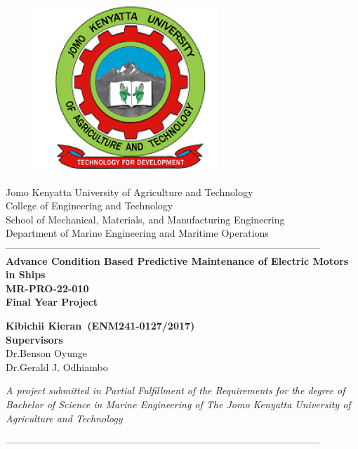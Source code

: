 \documentclass[12pt,fleqn]{article}
\begin{document}
\begin{titlepage}
  \begin{center}
      \vspace*{-4.0cm}
    \begin{figure}[!h]
\centering
\includegraphics[width=0.3\linewidth]{Figures/JKUAT_logo}
\label{fig:jomologo}
\end{figure}
   \large{Jomo Kenyatta University of Agriculture and Technology}\\
    \large{College of Engineering and Technology}\\
    \large{School of Mechanical, Materials, and Manufacturing Engineering}\\
   \large{Department of Marine Engineering and Maritime Operations}\\

    ------------------------------------------------------------------------------------------------\\[0.3cm]
    \LARGE{\textbf{Advance Condition Based Predictive
    		Maintenance of Electric Motors in Ships}}\\[0.3cm]

    \large{\textbf{MR-PRO-22-010}}\\[0.4cm]
    \LARGE{\textbf{Final Year Project
            }}\\[0.3cm]

    \vspace{0.3cm}
 
     \large{\textbf{Kibichii Kieran~(ENM241-0127/2017)
            }}\\[0.5cm]
   \large{\textbf{Supervisors}}\\
   \large{Dr.Benson Oyunge}\\
   \large{Dr.Gerald J. Odhiambo}\\
   \vspace{0.6cm}
   
   

   \textit{A project submitted in Partial Fulfillment of the Requirements for the degree of Bachelor of Science in Marine Engineering of The Jomo Kenyatta University of Agriculture and Technology}


    ------------------------------------------------------------------------------------------------\\[1.5cm]
  \end{center}
\end{titlepage}
%
\end{document}
